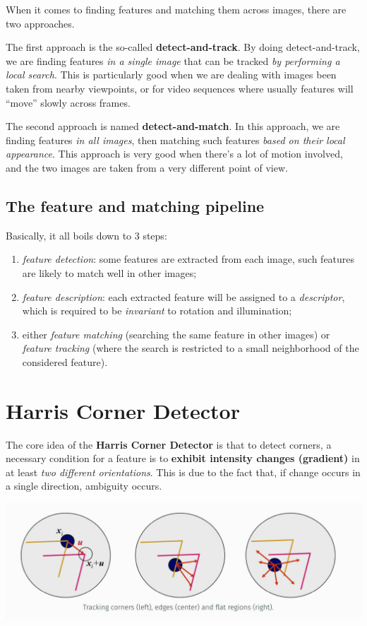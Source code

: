 \documentclass[10pt]{report}
\begin{document}
When it comes to finding features and matching them across images, there
are two approaches.

The first approach is the so-called \textbf{detect-and-track}. By doing
detect-and-track, we are finding features \emph{in a single image} that can
be tracked \emph{by performing a local search}. This is particularly good
when we are dealing with images been taken from nearby viewpoints, or
for video sequences where usually features will ``move'' slowly across
frames.

The second approach is named \textbf{detect-and-match}. In this approach, we
are finding features \emph{in all images}, then matching such features \emph{based
on their local appearance}. This approach is very good when there's a
lot of motion involved, and the two images are taken from a very
different point of view.

\subsection{The feature and matching pipeline}
\label{the-feature-and-matching-pipeline}
Basically, it all boils down to 3 steps:

\begin{enumerate}
\item \emph{feature detection}: some features are extracted from each image,
such features are likely to match well in other images;
\item \emph{feature description}: each extracted feature will be assigned to a
\emph{descriptor}, which is required to be \emph{invariant} to rotation and
illumination;
\item either \emph{feature matching} (searching the same feature in other
images) or \emph{feature tracking} (where the search is restricted to a
small neighborhood of the considered feature).
\end{enumerate}

\section{Harris Corner Detector}
\label{harris-corner-detector}
The core idea of the \textbf{Harris Corner Detector} is that to detect corners,
a necessary condition for a feature is to \textbf{exhibit intensity changes
(gradient)} in at least \emph{two different orientations}. This is due to the
fact that, if change occurs in a single direction, ambiguity occurs.

\begin{center}
\includegraphics[width=.9\linewidth]{./pics/det/corner-detection.jpg}
\end{center}
\end{document}
